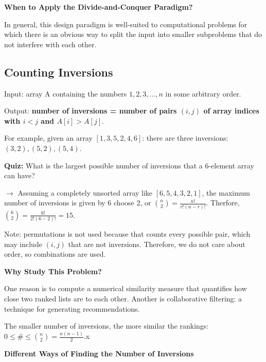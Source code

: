 \documentclass[11pt]{article}
\begin{document}
\textbf{When to Apply the Divide-and-Conquer Paradigm?}

\vspace{11pt}
In general, this design paradigm is well-suited to computational problems for which there is an obvious way to split the input into smaller subproblems that do not interfere with each other.

\vspace{11pt}
\subsection{Counting Inversions}
\vspace{11pt}

Input: array A containing the numbers $1, 2, 3, \dots, n$ in some arbitrary order.

Output: \textbf{number of inversions = number of pairs $(i,j)$ of array indices with $i<j$ and $A[i]>A[j]$}.

For example, given an array $[1,3,5,2,4,6]$: there are three inversions: $(3,2), (5,2), (5,4)$.

\vspace{11pt}
\textbf{Quiz:} What is the largest possible number of inversions that a 6-element array can have?
\vspace{11pt}

$\to$ Assuming a completely unsorted array like $[6,5,4,3,2,1]$, the maximum number of inversions is given by 6 choose 2, or $\binom{n}{2} = \frac{n!}{r!(n-r)!}$. Therfore, $\binom{6}{2} = \frac{6!}{2!(6-2)!} = 15$.

Note: permutations is not used because that counts every possible pair, which may include $(i,j)$ that are not inversions. Therefore, we do not care about order, so combinations are used.

\vspace{11pt}
\textbf{Why Study This Problem?}
\vspace{11pt}

One reason is to compute a numerical similarity measure that quantifies how close two ranked lists are to each other. Another is collaborative filtering: a technique for generating recommendations. 

The smaller number of inversions, the more similar the rankings: $0 \leq \# \leq \binom{n}{2} = \frac{n(n-1)}{2}$.x

\vspace{11pt}
\textbf{Different Ways of Finding the Number of Inversions}
\vspace{11pt}
\end{document}
